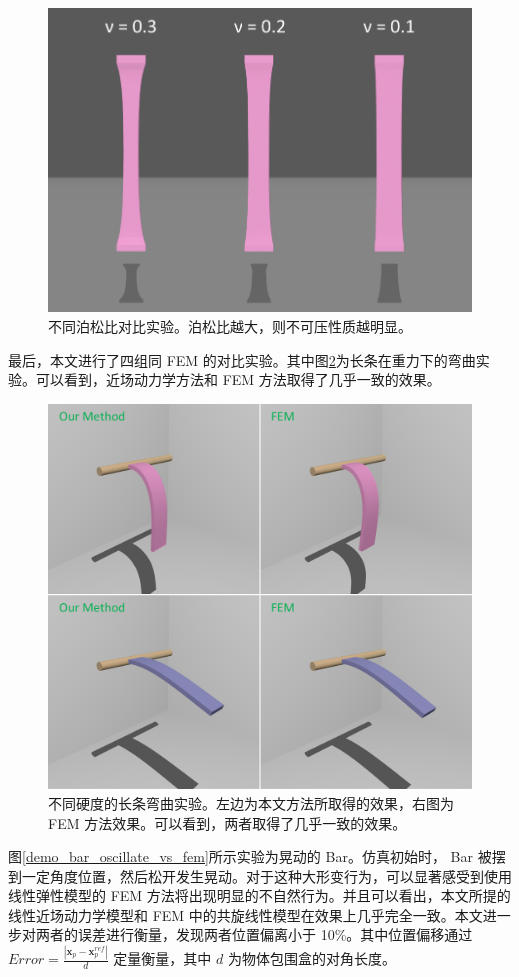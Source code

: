 \begin{figure}[!htb]
  \centering
  \captionsetup{justification=centering}
  \includegraphics[width=0.7\linewidth]{chap/image/compare_different_poisson_ratio}

  \caption{\label{compare_different_poisson_ratio}
           不同泊松比对比实验。泊松比越大，则不可压性质越明显。
          }
\end{figure}

最后，本文进行了四组同 FEM 的对比实验。其中图\ref{demo_strip_vs_fem}为长条在重力下的弯曲实验。可以看到，近场动力学方法和 FEM 方法取得了几乎一致的效果。

\begin{figure}[!htb]
  \centering
  \captionsetup{justification=centering}
  \includegraphics[width=0.7\linewidth]{chap/image/demo_strip_vs_fem}

  \caption{\label{demo_strip_vs_fem}
           不同硬度的长条弯曲实验。左边为本文方法所取得的效果，右图为 FEM 方法效果。可以看到，两者取得了几乎一致的效果。
          }
\end{figure}

图\ref{demo_bar_oscillate_vs_fem}所示实验为晃动的 Bar。仿真初始时， Bar 被摆到一定角度位置，然后松开发生晃动。对于这种大形变行为，可以显著感受到使用线性弹性模型的 FEM 方法将出现明显的不自然行为。并且可以看出，本文所提的线性近场动力学模型和 FEM 中的共旋线性模型在效果上几乎完全一致。本文进一步对两者的误差进行衡量，发现两者位置偏离小于 10\%。其中位置偏移通过 $Error = \frac{|\bm{x}_p-\bm{x}_p^{ref}|}{d}$ 定量衡量，其中 $d$ 为物体包围盒的对角长度。

